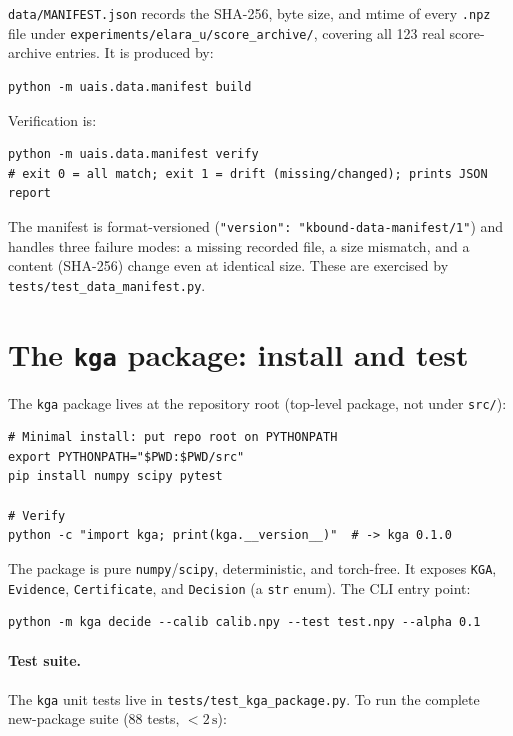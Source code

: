 \texttt{data/MANIFEST.json} records the SHA-256, byte size, and mtime of every
\texttt{.npz} file under \texttt{experiments/elara\_u/score\_archive/}, covering
all 123 real score-archive entries.  It is produced by:

\begin{verbatim}
python -m uais.data.manifest build
\end{verbatim}

Verification is:

\begin{verbatim}
python -m uais.data.manifest verify
# exit 0 = all match; exit 1 = drift (missing/changed); prints JSON report
\end{verbatim}

The manifest is format-versioned (\texttt{"version": "kbound-data-manifest/1"})
and handles three failure modes: a missing recorded file, a size mismatch, and
a content (SHA-256) change even at identical size.  These are exercised by
\texttt{tests/test\_data\_manifest.py}.

\section{The \texttt{kga} package: install and test}
\label{sec:app-repro-kgapkg}

The \texttt{kga} package lives at the repository root (top-level package, not
under \texttt{src/}):

\begin{verbatim}
# Minimal install: put repo root on PYTHONPATH
export PYTHONPATH="$PWD:$PWD/src"
pip install numpy scipy pytest

# Verify
python -c "import kga; print(kga.__version__)"  # -> kga 0.1.0
\end{verbatim}

The package is pure \texttt{numpy}/\texttt{scipy}, deterministic, and
torch-free.  It exposes \texttt{KGA}, \texttt{Evidence}, \texttt{Certificate},
and \texttt{Decision} (a \texttt{str} enum).  The CLI entry point:

\begin{verbatim}
python -m kga decide --calib calib.npy --test test.npy --alpha 0.1
\end{verbatim}

\paragraph{Test suite.}
The \texttt{kga} unit tests live in \texttt{tests/test\_kga\_package.py}.  To
run the complete new-package suite (88 tests, $< 2\,\mathrm{s}$):

